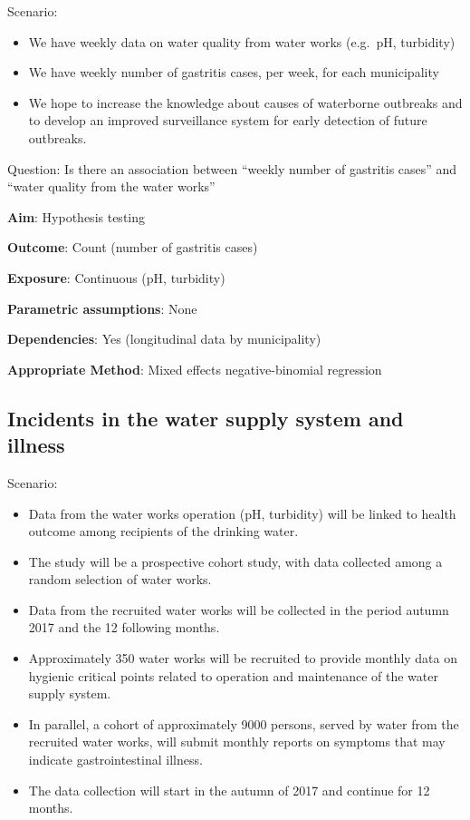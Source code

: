\documentclass[12pt,]{article}
\providecommand{\tightlist}{%
  \setlength{\itemsep}{0pt}\setlength{\parskip}{0pt}}
\begin{document}
Scenario:

\begin{itemize}
\tightlist
\item
  We have weekly data on water quality from water works (e.g.~pH,
  turbidity)
\item
  We have weekly number of gastritis cases, per week, for each
  municipality
\item
  We hope to increase the knowledge about causes of waterborne outbreaks
  and to develop an improved surveillance system for early detection of
  future outbreaks.
\end{itemize}

Question: Is there an association between ``weekly number of gastritis
cases'' and ``water quality from the water works''

\textbf{Aim}: Hypothesis testing

\textbf{Outcome}: Count (number of gastritis cases)

\textbf{Exposure}: Continuous (pH, turbidity)

\textbf{Parametric assumptions}: None

\textbf{Dependencies}: Yes (longitudinal data by municipality)

\textbf{Appropriate Method}: Mixed effects negative-binomial regression

\subsection{Incidents in the water supply system and
illness}\label{incidents-in-the-water-supply-system-and-illness-1}

Scenario:

\begin{itemize}
\tightlist
\item
  Data from the water works operation (pH, turbidity) will be linked to
  health outcome among recipients of the drinking water.
\item
  The study will be a prospective cohort study, with data collected
  among a random selection of water works.
\item
  Data from the recruited water works will be collected in the period
  autumn 2017 and the 12 following months.
\item
  Approximately 350 water works will be recruited to provide monthly
  data on hygienic critical points related to operation and maintenance
  of the water supply system.
\item
  In parallel, a cohort of approximately 9000 persons, served by water
  from the recruited water works, will submit monthly reports on
  symptoms that may indicate gastrointestinal illness.
\item
  The data collection will start in the autumn of 2017 and continue for
  12 months.
\end{itemize}
\end{document}
